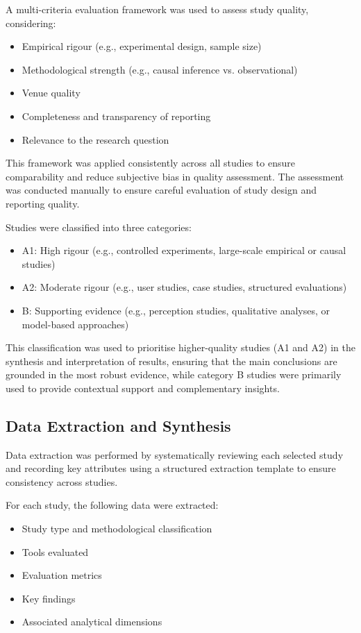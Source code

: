 \documentclass[conference]{IEEEtran}
\begin{document}
A multi-criteria evaluation framework was used to assess study quality, considering:

\begin{itemize}
    \item Empirical rigour (e.g., experimental design, sample size)
    \item Methodological strength (e.g., causal inference vs. observational)
    \item Venue quality
    \item Completeness and transparency of reporting
    \item Relevance to the research question
\end{itemize}

This framework was applied consistently across all studies to ensure comparability and reduce subjective bias in quality assessment. The assessment was conducted manually to ensure careful evaluation of study design and reporting quality.

Studies were classified into three categories:

\begin{itemize}
    \item A1: High rigour (e.g., controlled experiments, large-scale empirical or causal studies)
    \item A2: Moderate rigour (e.g., user studies, case studies, structured evaluations)
    \item B: Supporting evidence (e.g., perception studies, qualitative analyses, or model-based approaches)
\end{itemize}

This classification was used to prioritise higher-quality studies (A1 and A2) in the synthesis and interpretation of results, ensuring that the main conclusions are grounded in the most robust evidence, while category B studies were primarily used to provide contextual support and complementary insights.

\subsection{Data Extraction and Synthesis}

Data extraction was performed by systematically reviewing each selected study and recording key attributes using a structured extraction template to ensure consistency across studies.

For each study, the following data were extracted:

\begin{itemize}
    \item Study type and methodological classification
    \item Tools evaluated
    \item Evaluation metrics
    \item Key findings
    \item Associated analytical dimensions
\end{itemize}
\end{document}
